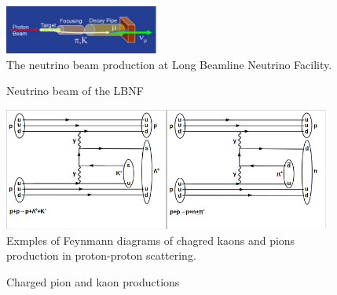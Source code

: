 \begin{figure}
\caption{Neutrino beam of the LBNF}
\label{fig:LBNF_nuBeam}
\centering
\includegraphics[width=0.45\textwidth, keepaspectratio=true]{figs/LBNF_nuBeam.png}
\\The neutrino beam production at Long Beamline Neutrino Facility. \cite{ref_LBNFweb}   
\end{figure}


\begin{figure}
\caption{Charged pion and kaon productions}
\label{fig:pionAndKaonProductions}
\centering
\includegraphics[width=0.48\textwidth, keepaspectratio=true]{figs/ppKaonProduction.png}\includegraphics[width=0.48\textwidth, keepaspectratio=true]{figs/ppPionProduction.png}
\\Exmples of Feynmann diagrams of chagred kaons and pions production in proton-proton scattering.    
\end{figure}


